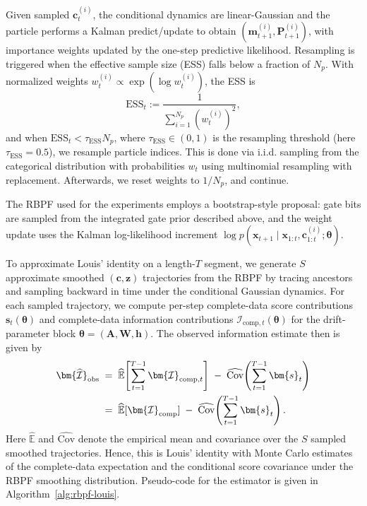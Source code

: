 \documentclass[twoside]{article}
\theoremstyle{plain}
\theoremstyle{definition}
\theoremstyle{remark}
\newcommand{\E}{\mathbb{E}}
\newcommand{\Cov}{\mathrm{Cov}}
\newcommand{\Ic}{\bm{\mathcal{I}}_{\mathrm{comp}}}
\newcommand{\Iohat}{\bm{\widehat{\mathcal{I}}}_{\mathrm{obs}}}
\begin{document}
Given sampled $\bm{c}_t^{(i)}$, the conditional dynamics are linear-Gaussian and the particle performs a Kalman predict/update to obtain $(\bm m_{t+1}^{(i)},\bm P_{t+1}^{(i)})$, with importance weights updated by the one-step predictive likelihood.
Resampling is triggered when the effective sample size (ESS) falls below a fraction of $N_p$. With normalized weights $w_t^{(i)}\propto\exp(\log w_t^{(i)})$, the ESS is
\begin{equation}
	\label{eq:rbpf_ess}
	\mathrm{ESS}_t := \frac{1}{\sum_{i=1}^{N_p} (w_t^{(i)})^2},
\end{equation}
and when $\mathrm{ESS}_t < \tau_{\mathrm{ESS}} N_p$, where $\tau_{\mathrm{ESS}}\in(0,1)$ is the resampling threshold (here $\tau_{\mathrm{ESS}}{=}0.5$), we resample particle indices. This is done via i.i.d. sampling from the categorical distribution with probabilities $w_t$ using multinomial resampling with replacement. Afterwards, we reset weights to $1/N_p$, and continue. 

The RBPF used for the experiments employs a bootstrap-style proposal: gate bits are sampled from the integrated gate prior described above, and the weight update uses the Kalman log-likelihood increment $\log p(\bm{x}_{t+1}\mid \bm{x}_{1:t},\bm{c}_{1:t}^{(i)};\bm\theta)$.

To approximate Louis' identity on a length-$T$ segment, we generate $S$ approximate smoothed $(\bm c,\bm z)$ trajectories from the RBPF by tracing ancestors and sampling backward in time under the conditional Gaussian dynamics. For each sampled trajectory, we compute per-step complete-data score contributions $\bm{s}_t(\bm\theta)$ and complete-data information contributions $\bm{\mathcal{I}}_{\mathrm{comp},t}(\bm\theta)$ for the drift-parameter block $\bm\theta=(\bm A,\bm W,\bm h)$.
The observed information estimate then is given by
\begin{align}
\Iohat
&\;=\; \widehat{\E}\!\left[\sum_{t=1}^{T-1}\bm{\mathcal{I}}_{\mathrm{comp},t}\right] \; - \; \widehat{\Cov}\!\left(\sum_{t=1}^{T-1}\bm{s}_t\right)\notag\\
&\;=\; \widehat{\E}[\Ic] \; - \; \widehat{\Cov}\!\left(\sum_{t=1}^{T-1}\bm{s}_t\right).
\end{align}
Here $\widehat{\E}$ and $\widehat{\Cov}$ denote the empirical mean and covariance over the $S$ sampled smoothed trajectories. Hence,
this is Louis’ identity with Monte Carlo estimates of the complete-data expectation and the conditional score covariance under the RBPF smoothing distribution. Pseudo-code for the estimator is given in Algorithm~\ref{alg:rbpf-louis}.
\end{document}
